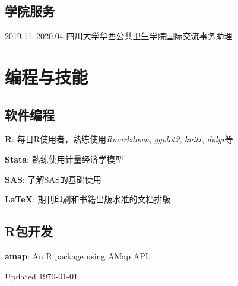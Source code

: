 \documentclass[12pt,letterpaper]{report}
\newcommand{\listitemspace}{0.15em}
\renewenvironment{itemize}
{\begin{list}{}{\setlength{\leftmargin}{0em}
            \setlength{\parskip}{0em}
            \setlength{\itemsep}{\listitemspace}
            \setlength{\parsep}{\listitemspace}}}
    {\end{list}}
\begin{document}
    \subsection*{学院服务}

    \begin{tablist}
    	
    	\item[2019.11--2020.04]  \tab 四川大学华西公共卫生学院国际交流事务助理
    
    \end{tablist}
	


    \section*{编程与技能}

    \subsection*{软件编程}

    \begin{itemize}

        \item \textbf{R}: 每日R使用者，熟练使用\textit{Rmarkdown}, \textit{ggplot2}, \textit{knitr}, \textit{dplyr}等
        \item \textbf{Stata}: 熟练使用计量经济学模型
        \item \textbf{SAS}: 了解SAS的基础使用
        \item \textbf{\LaTeX}: 期刊印刷和书籍出版水准的文档排版

    \end{itemize}

    \subsection*{R包开发}
    \begin{itemize}

 	\item \href{https://github.com/xiaojunlin/amap}{\textbf{amap}}: An R package using AMap API. 

    \end{itemize}

    \begin{center}
        \vfill
        Updated \monthyeardate\today
    \end{center}
\end{document}
